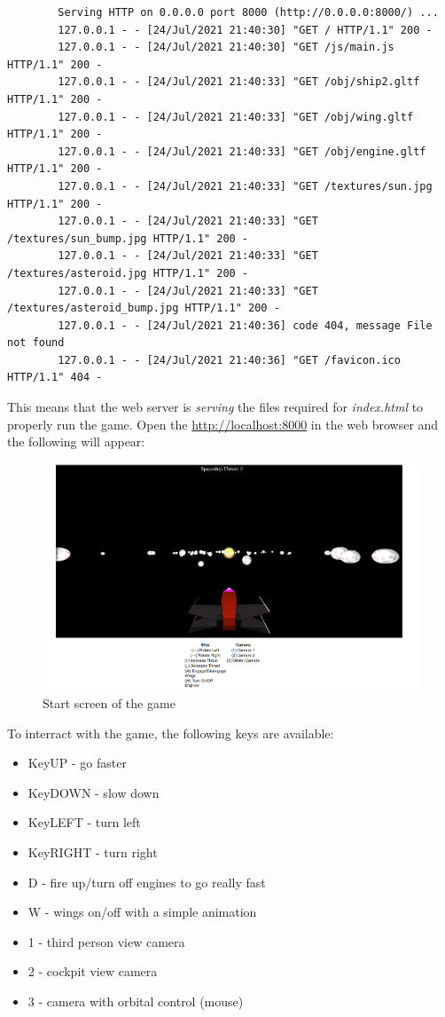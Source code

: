 \documentclass[12pt,a4paper]{report}
\begin{document}
	{\footnotesize
	\begin{verbatim}
		Serving HTTP on 0.0.0.0 port 8000 (http://0.0.0.0:8000/) ...
		127.0.0.1 - - [24/Jul/2021 21:40:30] "GET / HTTP/1.1" 200 -
		127.0.0.1 - - [24/Jul/2021 21:40:30] "GET /js/main.js HTTP/1.1" 200 -
		127.0.0.1 - - [24/Jul/2021 21:40:33] "GET /obj/ship2.gltf HTTP/1.1" 200 -
		127.0.0.1 - - [24/Jul/2021 21:40:33] "GET /obj/wing.gltf HTTP/1.1" 200 -
		127.0.0.1 - - [24/Jul/2021 21:40:33] "GET /obj/engine.gltf HTTP/1.1" 200 -
		127.0.0.1 - - [24/Jul/2021 21:40:33] "GET /textures/sun.jpg HTTP/1.1" 200 -
		127.0.0.1 - - [24/Jul/2021 21:40:33] "GET /textures/sun_bump.jpg HTTP/1.1" 200 -
		127.0.0.1 - - [24/Jul/2021 21:40:33] "GET /textures/asteroid.jpg HTTP/1.1" 200 -
		127.0.0.1 - - [24/Jul/2021 21:40:33] "GET /textures/asteroid_bump.jpg HTTP/1.1" 200 -
		127.0.0.1 - - [24/Jul/2021 21:40:36] code 404, message File not found
		127.0.0.1 - - [24/Jul/2021 21:40:36] "GET /favicon.ico HTTP/1.1" 404 -
	\end{verbatim} }
	
	This means that the web server is \textit{serving} the files required for \textit{index.html} to properly run the game. Open the \url{http://localhost:8000} in the web browser and the following will appear:
	
	\begin{figure}[H]
		\centering
		\includegraphics[width=0.9\linewidth]{img/screen}
		\caption{Start screen of the game}
		\label{fig:screen}
	\end{figure}

	To interract with the game, the following keys are available:
	
	\begin{itemize}
		\item KeyUP - go faster
		\item KeyDOWN - slow down
		\item KeyLEFT - turn left
		\item KeyRIGHT - turn right
		\item D - fire up/turn off engines to go really fast
		\item W - wings on/off with a simple animation
		\item 1 - third person view camera
		\item 2 - cockpit view camera
		\item 3 - camera with orbital control (mouse)
	\end{itemize}
	
	
\end{document}

